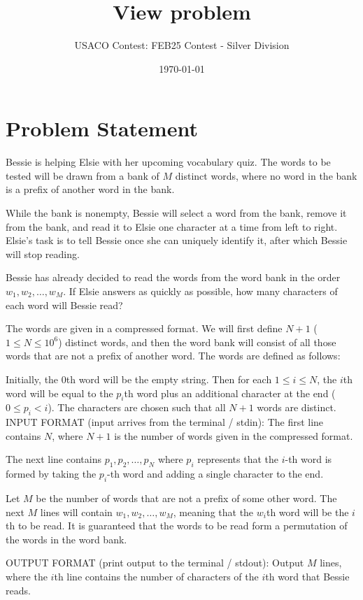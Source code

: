 \documentclass[12pt]{article}
\title{View problem}
\author{USACO Contest: FEB25 Contest - Silver Division}
\date{\today}
\begin{document}
\maketitle

\section*{Problem Statement}


Bessie is helping Elsie with her upcoming vocabulary quiz. The words to be
tested will be drawn from a bank of $M$ distinct words, where no word in the
bank is a prefix of another word in the bank.

While the bank is nonempty, Bessie will select a word from the bank, remove it
from the bank, and read it to Elsie one character at a time from left to right.
Elsie's task is to tell Bessie once she can uniquely identify it, after which
Bessie will stop reading. 

Bessie has already decided to read the words from the word bank in the order 
$w_1,w_2,\dots,w_M$. If Elsie answers as quickly as possible, how  many
characters of each word will Bessie read?

The words are given in a compressed format. We will first define $N+1$
($1\le N\le 10^6$) distinct words, and then the word bank will consist of all
those words that are not a prefix of another word. The words are defined as
follows:

Initially, the $0$th word will be the empty string. Then for each $1\le i\le N$,  the $i$th word will be equal to the $p_i$th
word plus an additional character at the end ($0\le p_i<i$). The characters are
chosen such that all $N+1$ words are distinct.
INPUT FORMAT (input arrives from the terminal / stdin):
The first line contains $N$, where $N+1$ is the number of words given in the
compressed format.

The next line contains $p_1,p_2,\dots,p_N$ where $p_i$ represents that the
$i$-th word is formed by taking the $p_i$-th word and adding a single character
to the end.

Let $M$ be the number of words that are not a prefix of some other word. The
next $M$ lines will contain $w_1,w_2,\dots,w_M$, meaning that the $w_i$th word
will be the $i$th to be read. It is guaranteed that the  words to be read form a
permutation of the words in the word bank.

OUTPUT FORMAT (print output to the terminal / stdout):
Output $M$ lines, where the $i$th line contains the number of characters of the 
$i$th word that Bessie reads.
\end{document}
